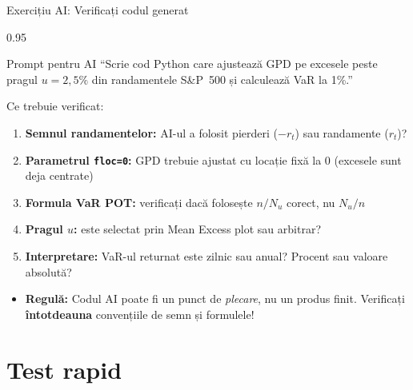 \documentclass[9pt, aspectratio=169, t]{beamer}
\begin{document}
\begin{frame}{Exercițiu AI: Verificați codul generat}
    \begin{cminipage}{0.95\textwidth}
\begin{alertblock}{Prompt pentru AI}
\small
``Scrie cod Python care ajustează GPD pe excesele peste pragul $u=2{,}5\%$ din randamentele S\&P~500 și calculează VaR la 1\%.''
\end{alertblock}

\vspace{0.2cm}
\begin{block}{Ce trebuie verificat:}
\begin{enumerate}\setlength{\itemsep}{2pt}
    \item \textbf{Semnul randamentelor:} AI-ul a folosit pierderi ($-r_t$) sau randamente ($r_t$)?
    \item \textbf{Parametrul \texttt{floc=0}:} GPD trebuie ajustat cu locație fixă la 0 (excesele sunt deja centrate)
    \item \textbf{Formula VaR POT:} verificați dacă folosește $n/N_u$ corect, nu $N_u/n$
    \item \textbf{Pragul $u$:} este selectat prin Mean Excess plot sau arbitrar?
    \item \textbf{Interpretare:} VaR-ul returnat este zilnic sau anual? Procent sau valoare absolută?
\end{enumerate}
\end{block}

\begin{itemize}\setlength{\itemsep}{0pt}
    \item \textbf{Regulă:} Codul AI poate fi un punct de \textit{plecare}, nu un produs finit. Verificați \textbf{întotdeauna} convențiile de semn și formulele!
\end{itemize}
    \end{cminipage}
\end{frame}

\section{Test rapid}
\end{document}
